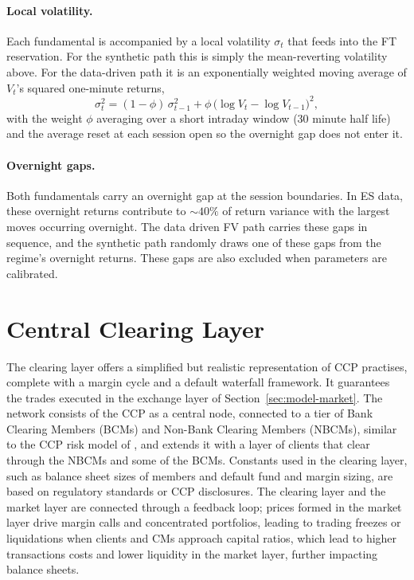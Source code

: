 \paragraph{Local volatility.}
Each fundamental is accompanied by a local volatility $\sigma_t$ that feeds into the FT reservation. For the synthetic path this is simply the mean-reverting volatility above. For
the data-driven path it is an exponentially weighted moving average of $V_t$'s squared one-minute
returns,
\begin{equation}
  \sigma_t^2 = (1-\phi)\,\sigma_{t-1}^2 + \phi\,\big(\log V_t - \log V_{t-1}\big)^2,
\end{equation}
with the weight $\phi$ averaging over a short intraday window (30 minute half life) and the average reset at each session open so the overnight gap does not enter it. 

\paragraph{Overnight gaps.}

Both fundamentals carry an overnight gap at the session boundaries. In ES data, these overnight returns contribute to $\sim 40\%$ of return variance with the largest moves occurring overnight. The data driven FV path carries these gaps in sequence, and the synthetic path randomly draws one of these gaps from the regime's overnight returns. These gaps are also excluded when parameters are calibrated.


\section{Central Clearing Layer}

The clearing layer offers a simplified but realistic representation of CCP practises, complete with a margin cycle and a default waterfall framework. It guarantees the trades executed in the exchange layer of Section~\ref{sec:model-market}. The network consists of the CCP as a central node, connected to a tier of Bank Clearing Members (BCMs) and Non-Bank Clearing Members (NBCMs), similar to the CCP risk model of \cite{simudyne_odd}, and extends it with a layer of clients that clear through the NBCMs and some of the BCMs. Constants used in the clearing layer, such as balance sheet sizes of members and default fund and margin sizing, are based on regulatory standards or CCP disclosures. The clearing layer and the market layer are connected through a feedback loop; prices formed in the market layer drive margin calls and concentrated portfolios, leading to trading freezes or liquidations when clients and CMs approach capital ratios, which lead to higher transactions costs and lower liquidity in the market layer, further impacting balance sheets.  

